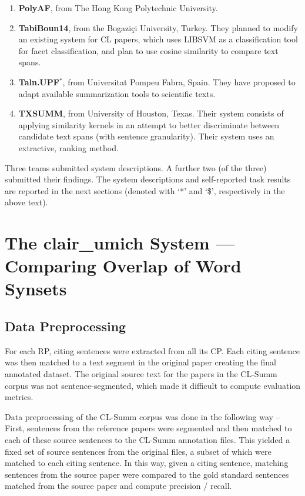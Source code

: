 \documentclass[11pt]{article}
\begin{document}
\begin{enumerate}
\vspace{-.3cm}
\item{{\bf PolyAF}, from The Hong Kong Polytechnic University.}
\vspace{-.3cm}
\item{{\bf TabiBoun14}, from the Bogaziçi University, Turkey. They
  planned to modify an existing system for CL papers, which uses
  LIBSVM as a classification tool for facet classification, and plan to 
  use cosine similarity to compare text spans.}
\vspace{-.3cm}
\item{{\bf Taln.UPF$^{*}$}, from Universitat Pompeu Fabra, Spain. They
  have proposed to adapt available summarization tools to scientific
  texts.}
\vspace{-.3cm}
\item{{\bf TXSUMM}, from University of Houston, Texas. Their system
  consists of applying similarity kernels in an attempt to better
  discriminate between candidate text spans (with sentence
  granularity). Their system uses an extractive, ranking method.}

\end{enumerate}

Three teams submitted system descriptions.  A further two (of the
three) submitted their findings.  The system descriptions and
self-reported task results are reported in the next sections (denoted
with `*' and `\$', respectively in the above text). 

\section{The clair\_umich System --- Comparing Overlap of Word Synsets}
\label{s:umich}
\subsection{Data Preprocessing}

For each RP, citing sentences were extracted from all its CP. Each
citing sentence was then matched to a text segment in the original
paper creating the final annotated dataset. The original source text
for the papers in the CL-Summ corpus was not sentence-segmented, which
made it difficult to compute evaluation metrics.

Data preprocessing of the CL-Summ corpus was done in the following way -- First, 
sentences from the reference papers were segmented and then matched to each of 
these source sentences to the CL-Summ annotation files. This yielded a fixed 
set of source sentences from the original files, a subset of which were 
matched to each citing sentence. In this way, given a citing sentence, 
matching sentences from the source paper were compared to the gold standard 
sentences matched from the source paper and compute precision / recall. 
\end{document}

